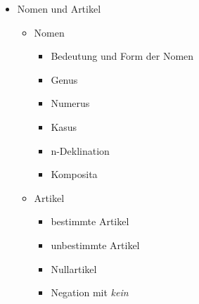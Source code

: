 \documentclass[a4paper]{article}
\begin{document}
\begin{itemize}
\begin{itemize}
                \item Verbale Spezialthemen
                \begin{itemize}
                    \item Bedeutung und Funktion von \textit{werden}
                    \item \textit{brauchen} und \textit{sich lassen}
                    \item Nomen-Verb-Verbindungen
                    \begin{itemize}
                        \item freie Nomen-Verb-Verbindungen
                        \item Funktionsverbgefüge
                        \item figurative Nomen-Verb-Verbindungen
                    \end{itemize}
                \end{itemize}
            \end{itemize}
            
            \item Nomen und Artikel
            \begin{itemize}
                \item Nomen
                \begin{itemize}
                    \item Bedeutung und Form der Nomen
                    \item Genus
                    \item Numerus
                    \item Kasus
                    \item n-Deklination
                    \item Komposita
                \end{itemize}
                
                \item Artikel
                \begin{itemize}
                    \item bestimmte Artikel
                    \item unbestimmte Artikel
                    \item Nullartikel
                    \item Negation mit \textit{kein}
                \end{itemize}
            \end{itemize}
            

\end{itemize}
\end{document}
